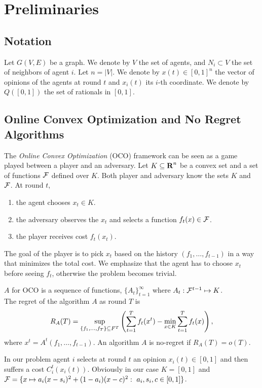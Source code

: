 \section{Preliminaries}
\subsection{Notation}
Let $G(V,E)$ be a graph. We denote by $V$ the set of agents,
and $N_{i} \subset V$ the set of neighbors of agent $i$. Let $n = |V|$.
We denote by $x(t)\in [0,1]^n$ the vector of opinions of the agents at round
$t$ and $x_i(t)$ its $i$-th coordinate. We denote by $Q([0,1])$
the set of rationals in $[0,1]$.

\subsection{Online Convex Optimization and No Regret Algorithms}

The \emph{Online Convex Optimization} (OCO) framework can be seen
as a game played between a player and an adversary. Let
$K \subseteq \bm{\mathrm{R}}^n$ be a convex set and a set of functions
$\mathcal{F}$ defined over $K$.  Both player and adversary know the sets
$K$ and $\mathcal{F}$.  At round $t$,
\begin{enumerate}
  \item the agent chooses $x_t \in K$.

  \item the adversary observes the $x_t$ and selects a function
    $f_t(x) \in \mathcal{F}$.

  \item the player receives cost $f_t(x_t)$.
\end{enumerate}

The goal of the player is to pick $x_t$ based on the history
$(f_1,\ldots,f_{t-1})$ in a way that minimizes the total cost. We emphasize
that the agent has to choose $x_t$ before seeing $f_t$, otherwise the
problem becomes trivial.

\begin{definition}\label{d:regret}
  $A$ for OCO is a sequence of functions, $\{A_t\}_{t=1}^{\infty}$ where
  $A_t:\mathcal{F}^{t-1} \mapsto K$.\\
  The regret of the algorithm $A$ as round $T$ is
  \[R_A(T)=\sup_{\{f_1,\ldots ,f_T\}\subseteq F^T}\left(\sum_{t=1}^T f_t(x^t) -
    \min_{x\in K}\sum_{t=1}^T f_t(x)\right),\]
  where $x^t = A^t(f_1,\ldots, f_{t-1})$.
  An algorithm $A$ is no-regret if $R_A(T)=o(T)$.
\end{definition}
In our problem agent $i$ selects at round $t$ an
opinion $x_i(t) \in [0,1]$ and then suffers a cost $C^t_i(x_i(t))$.
Obviously in our case $K=[0,1]$ and
\(
  \mathcal{F} =
  \{
  x \mapsto a_i (x - s_i)^2 + (1-a_i) (x - c)^2:
  \ a_i, s_i, c \in [0,1]
  \}
\).

